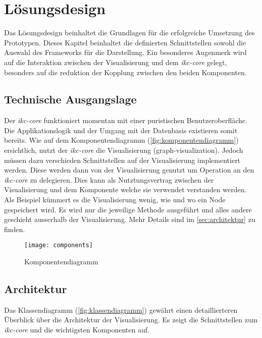 \chapter{Lösungsdesign}

Das Lösungsdesign beinhaltet die Grundlagen für die erfolgreiche Umsetzung des Prototypen. Dieses Kapitel beinhaltet die definierten Schnittstellen sowohl die Auswahl des Frameworks für die Darstellung. Ein besonderes Augenmerk wird auf die Interaktion zwischen der Visualisierung und dem \textit{ikc-core} gelegt, besonders auf die reduktion der Kopplung zwischen den beiden Komponenten. 

\section{Technische Ausgangslage}
Der \textit{ikc-core} funktioniert momentan mit einer puristischen Benutzeroberfläche. Die Applikationslogik und der Umgang mit der Datenbasis existieren somit  bereits. Wie auf dem Komponentendiagramm (\autoref{fig:komponentendiagramm}) ersichtlich, nutzt der \textit{ikc-core} die Visualisierung (graph-visualization). Jedoch müssen dazu verschieden Schnittstellen auf der Visualisierung implementiert werden. Diese werden dann von der Visualisierung genutzt um Operation an den \textit{ikc-core} zu delegieren. Dies kann als Nutztungsvertrag zwischen der Visualisierung und dem Komponente welche sie verwendet verstanden werden. Als Beispiel kümmert es die Visualisierung wenig, wie und wo ein Node gespeichert wird. Es wird nur die jeweilige Methode ausgeführt und alles andere geschieht ausserhalb der Visualisierung. Mehr Details sind im \autoref{sec:architektur} zu finden.

\begin{figure}[H]
\centering
\texttt{[image: components]}
\caption{Komponentendiagramm}
\label{fig:komponentendiagramm}
\end{figure}

\section{Architektur}
\label{sec:architektur}

Das Klassendiagramm (\autoref{fig:klassendiagramm}) gewährt einen detaillierteren Überblick über die Architektur der Visualisierung. Es zeigt die Schnittstellen zum \textit{ikc-core} und die wichtigsten Komponenten auf.


